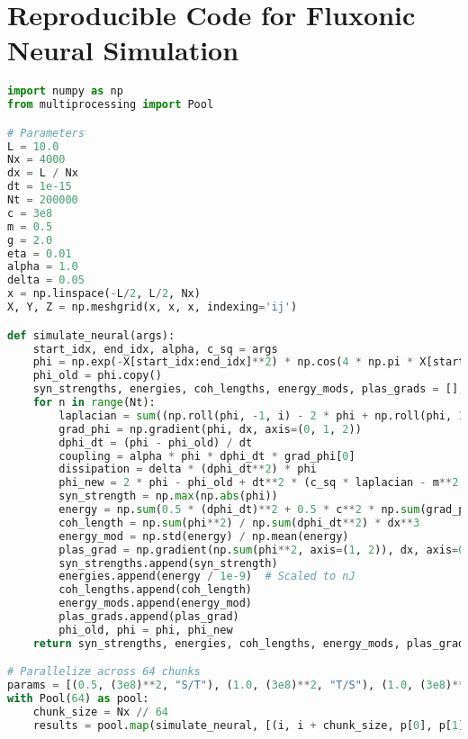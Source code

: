 \documentclass[11pt]{article}
\begin{document}
\section{Reproducible Code for Fluxonic Neural Simulation}
\begin{lstlisting}[language=Python, caption={Fluxonic Neural Simulation with Coherence and Gradients}, label=lst:synapse]
import numpy as np
from multiprocessing import Pool

# Parameters
L = 10.0
Nx = 4000
dx = L / Nx
dt = 1e-15
Nt = 200000
c = 3e8
m = 0.5
g = 2.0
eta = 0.01
alpha = 1.0
delta = 0.05
x = np.linspace(-L/2, L/2, Nx)
X, Y, Z = np.meshgrid(x, x, x, indexing='ij')

def simulate_neural(args):
    start_idx, end_idx, alpha, c_sq = args
    phi = np.exp(-X[start_idx:end_idx]**2) * np.cos(4 * np.pi * X[start_idx:end_idx]) + 0.1 * np.random.rand(Nx//64, Nx, Nx)
    phi_old = phi.copy()
    syn_strengths, energies, coh_lengths, energy_mods, plas_grads = [], [], [], [], []
    for n in range(Nt):
        laplacian = sum((np.roll(phi, -1, i) - 2 * phi + np.roll(phi, 1, i)) / dx**2 for i in range(3))
        grad_phi = np.gradient(phi, dx, axis=(0, 1, 2))
        dphi_dt = (phi - phi_old) / dt
        coupling = alpha * phi * dphi_dt * grad_phi[0]
        dissipation = delta * (dphi_dt**2) * phi
        phi_new = 2 * phi - phi_old + dt**2 * (c_sq * laplacian - m**2 * phi - g * phi**3 - eta * phi**5 + coupling - dissipation)
        syn_strength = np.max(np.abs(phi))
        energy = np.sum(0.5 * (dphi_dt)**2 + 0.5 * c**2 * np.sum(grad_phi**2, axis=0) + 0.5 * m**2 * phi**2 + 0.25 * g * phi**4 + 0.1667 * eta * phi**6) * dx**3
        coh_length = np.sum(phi**2) / np.sum(dphi_dt**2) * dx**3
        energy_mod = np.std(energy) / np.mean(energy)
        plas_grad = np.gradient(np.sum(phi**2, axis=(1, 2)), dx, axis=0)
        syn_strengths.append(syn_strength)
        energies.append(energy / 1e-9)  # Scaled to nJ
        coh_lengths.append(coh_length)
        energy_mods.append(energy_mod)
        plas_grads.append(plas_grad)
        phi_old, phi = phi, phi_new
    return syn_strengths, energies, coh_lengths, energy_mods, plas_grads

# Parallelize across 64 chunks
params = [(0.5, (3e8)**2, "S/T"), (1.0, (3e8)**2, "T/S"), (1.0, (3e8)**2, "S=T")]
with Pool(64) as pool:
    chunk_size = Nx // 64
    results = pool.map(simulate_neural, [(i, i + chunk_size, p[0], p[1]) for i in range(0, Nx, chunk_size) for p in params])
\end{lstlisting}
\end{document}
